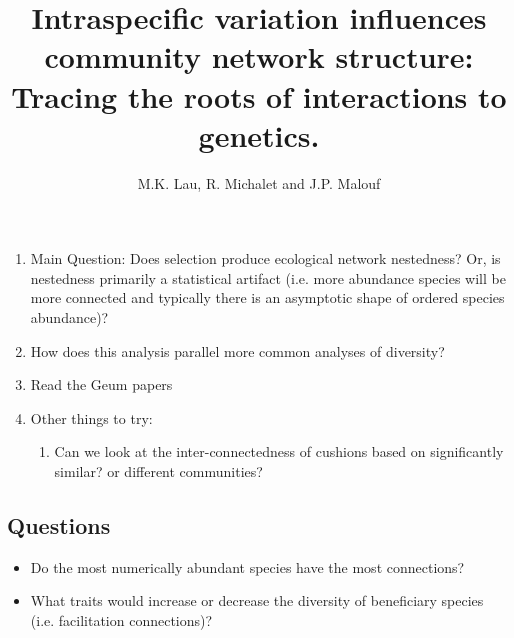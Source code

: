 \documentclass[12pt]{article}
\title{Intraspecific variation influences community network structure: Tracing the roots of interactions to genetics.}
\author{M.K. Lau, R. Michalet and J.P. Malouf}
\begin{document}
\maketitle

\setcounter{tocdepth}{3}
\tableofcontents

\begin{enumerate}
\item Main Question: Does selection produce ecological network
  nestedness? Or, is nestedness primarily a statistical artifact
  (i.e. more abundance species will be more connected and typically
  there is an asymptotic shape of ordered species abundance)?
\item How does this analysis parallel more common analyses of
  diversity?
\item Read the Geum papers    
\item Other things to try:
  \begin{enumerate}
  \item Can we look at the inter-connectedness of cushions based on
    significantly similar? or different communities?
  \end{enumerate}
\end{enumerate}

\subsection{Questions}

\begin{itemize}
  \item Do the most numerically abundant species have the most
    connections?
  \item What traits would increase or decrease the diversity of
    beneficiary species (i.e. facilitation connections)?
\end{itemize}


\end{document}
